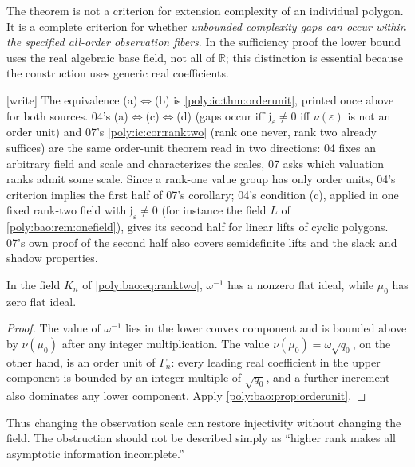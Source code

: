 \documentclass[11pt,a4paper]{article}
\numberwithin{equation}{section}
\theoremstyle{plain}
\newcommand{\wtag}{\textup{[write]}}%
\newcommand{\R}{\mathbb R}
\newcommand{\eps}{\varepsilon}
\newcommand{\JJ}{\mathfrak j}
\begin{document}
The theorem is not a criterion for extension complexity of an individual
polygon. It is a complete criterion for whether \emph{unbounded complexity
gaps can occur within the specified all-order observation fibers}.
In the sufficiency proof the lower bound uses the real algebraic base
field, not all of $\R$; this distinction is essential because the
construction uses generic real coefficients.

\begin{remark}\label{poly:bao:rem:sametheorem}
\wtag{} The equivalence (a)$\Leftrightarrow$(b) is
\cref{poly:ic:thm:orderunit}, printed once above for both sources. 04's
(a)$\Leftrightarrow$(c)$\Leftrightarrow$(d) (gaps occur iff $\JJ_\eps\neq0$
iff $\nu(\eps)$ is not an order unit) and 07's \cref{poly:ic:cor:ranktwo}
(rank one never, rank two already suffices) are the same order-unit
theorem read in two directions: 04 fixes an arbitrary field and scale and
characterizes the scales, 07 asks which valuation ranks admit some scale.
Since a rank-one value group has only order units, 04's criterion implies
the first half of 07's corollary; 04's condition (c), applied in one fixed
rank-two field with $\JJ_\eps\neq0$ (for instance the field $L$ of
\cref{poly:bao:rem:onefield}), gives its second half for linear lifts of
cyclic polygons.
07's own proof of the second half also covers semidefinite lifts and the
slack and shadow properties.
\end{remark}

\begin{corollary}\label{poly:bao:cor:twoscales}
In the field $K_n$ of \eqref{poly:bao:eq:ranktwo}, $\omega^{-1}$ has a nonzero flat
ideal, while $\mu_0$ has zero flat ideal.
\end{corollary}
\begin{proof}
The value of $\omega^{-1}$ lies in the lower convex component and is
bounded above by $\nu(\mu_0)$ after any integer multiplication. The value
$\nu(\mu_0)=\omega\sqrt{q_0}$, on the other hand, is an order unit of
$\Gamma_n$: every leading real coefficient in the upper component is
bounded by an integer multiple of $\sqrt{q_0}$, and a further increment
also dominates any lower component. Apply \cref{poly:bao:prop:orderunit}.
\end{proof}
Thus changing the observation scale can restore injectivity without
changing the field. The obstruction should not be described simply as
``higher rank makes all asymptotic information incomplete.''
\end{document}
